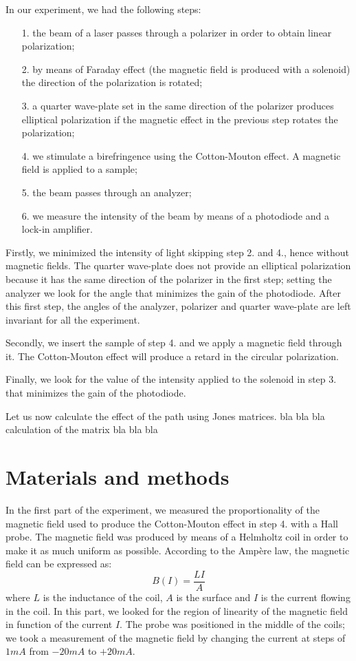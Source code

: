 \documentclass[•]{article}
\begin{document}
	In our experiment, we had the following steps:
	\begin{itemize}
	\item[1.] the beam of a laser passes through a polarizer in order to obtain linear polarization;
	\item[2.] by means of Faraday effect (the magnetic field is produced with a solenoid) the direction of the polarization is rotated;
	\item[3.] a quarter wave-plate set in the same direction of the polarizer produces elliptical polarization if the magnetic effect in the previous step rotates the polarization;
	\item[4.] we stimulate a birefringence using the Cotton-Mouton effect. A magnetic field is applied to a sample;
	\item[5.] the beam passes through an analyzer;
	\item[6.] we measure the intensity of the beam by means of a photodiode and a lock-in amplifier.
\end{itemize}	

Firstly, we minimized the intensity of light skipping step 2. and 4., hence without magnetic fields.  The quarter wave-plate does not provide an elliptical polarization because it has the same direction of the polarizer in the first step; setting the analyzer we look for the angle that minimizes the gain of the photodiode. After this first step, the angles of the analyzer, polarizer and quarter wave-plate are left invariant for all the experiment.

Secondly, we insert the sample of step 4. and we apply a magnetic field through it. The Cotton-Mouton effect will produce a retard in the circular polarization. 

Finally, we look for the value of the intensity applied to the solenoid in step 3. that minimizes the gain of the photodiode. 

Let us now calculate the effect of the path using Jones matrices. bla bla bla calculation of the matrix bla bla bla
\section{Materials and methods}
In the first part of the experiment, we measured the proportionality of the magnetic field used to produce the Cotton-Mouton effect in step 4. with a Hall probe. The magnetic field was produced by means of a Helmholtz coil in order to make it as much uniform as possible. According to the Ampère law, the magnetic field can be expressed as:
\begin{equation}
B(I)=\frac{LI}{A}
\end{equation}
where $L$ is the inductance of the coil, $A$ is the surface and $I$ is the current flowing in the coil. In this part, we looked for the region of linearity of the magnetic field in function of the current $I$. The probe was positioned in the middle of the coils; we took a measurement of the magnetic field by changing the current at steps of $1mA$ from $-20mA$ to $+20mA$.
\end{document}
